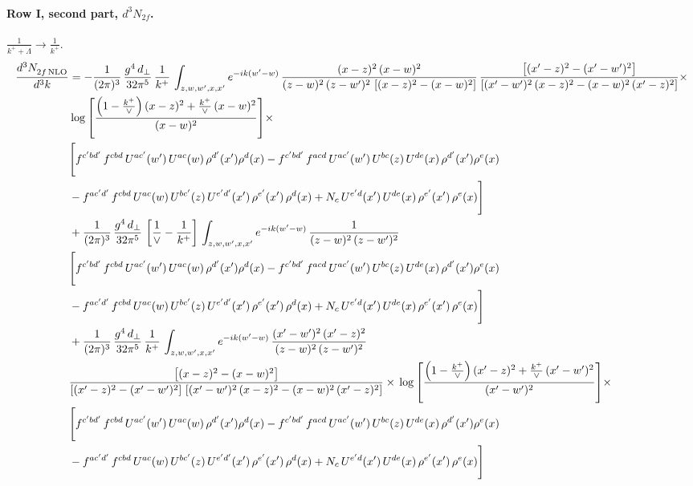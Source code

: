 \documentclass[10pt]{article}
\numberwithin{equation}{section}
\begin{document}
\paragraph{Row I, second part, $d^3N_{2f}$.}
$\frac{1}{k^++\Lambda}\to\frac{1}{k^+}$.
\begin{align}
    \frac{d^{3}N_{2f\,\rm NLO}^{\rm}}{d^{3}k}  & =   - \frac{1}{(2\pi)^{3}}\, \frac{g^{4}\,d_{\perp}}{32\pi^{5}}\,\frac{1}{k^{+}}\,\int_{z,w,w^{\prime},x,x'} e^{-ik(w^{\prime}-w)}\,\frac{(x-z)^{2}\, (x-w)^{2}}{(z-w)^{2}\, (z-w')^{2}\,\left[(x-z)^{2} - (x-w)^{2}\right]}\,\frac{\left[(x'-z)^{2}-(x'-w')^{2}\right]}{\left[(x'-w')^{2}\, (x-z)^{2} - (x-w)^{2}\, (x'-z)^{2}\right]}\times\notag \\ & \log{\left[\frac{\left(1-\frac{k^{+}}{\vee}\right)(x-z)^{2}+\frac{k^{+}}{\vee}\,(x-w)^{2}}{(x-w)^{2}}\right]}\times\notag \\ & \Bigg[f^{c'bd'}\,f^{cbd}\, U^{ac'}(w')\,U^{ac}(w)\,\rho^{d'}(x')\rho^{d}(x)- f^{c'bd'}\,f^{acd}\,U^{ac'}(w')\,U^{bc}(z)\,U^{de}(x)\,\rho^{d'}(x')\rho^{e}(x) \notag \\ & -f^{ac'd'}\,f^{cbd}\,U^{ac}(w)\,U^{bc'}(z)\,U^{e'd'}(x')\,\rho^{e'}(x')\,\rho^{d}(x) +N_{c}\,U^{e'd}(x')\,U^{de}(x)\,\rho^{e'}(x')\,\rho^{e}(x)\Bigg]  \notag \\
& + \frac{1}{(2\pi)^{3}}\, \frac{g^{4}\,d_{\perp}}{32\pi^{5}}\,\left[\frac{1}{\vee} - \frac{1}{k^{+}}\right]\,\int_{z,w,w^{\prime},x,x'} e^{-ik(w^{\prime}-w)}\,\frac{1}{(z-w)^{2}\, (z-w')^{2}}\notag \\ & \Bigg[f^{c'bd'}\,f^{cbd}\, U^{ac'}(w')\,U^{ac}(w)\,\rho^{d'}(x')\rho^{d}(x)- f^{c'bd'}\,f^{acd}\,U^{ac'}(w')\,U^{bc}(z)\,U^{de}(x)\,\rho^{d'}(x')\rho^{e}(x) \notag \\ & -f^{ac'd'}\,f^{cbd}\,U^{ac}(w)\,U^{bc'}(z)\,U^{e'd'}(x')\,\rho^{e'}(x')\,\rho^{d}(x) +N_{c}\,U^{e'd}(x')\,U^{de}(x)\,\rho^{e'}(x')\,\rho^{e}(x)\Bigg]  \notag \\
& + \frac{1}{(2\pi)^{3}}\, \frac{g^{4}\,d_{\perp}}{32\pi^{5}}\,\frac{1}{k^{+}}\,\int_{z,w,w^{\prime},x,x'} e^{-ik(w^{\prime}-w)}\,\frac{(x'-w')^{2}\, (x'-z)^{2}}{(z-w)^{2}\, (z-w')^{2}}\notag \\ & \frac{\left[(x-z)^{2} - (x-w)^{2}\right]}{\left[(x'-z)^{2} - (x'-w')^{2}\right]\, \left[(x'-w')^{2}\, (x - z)^{2} - (x-w)^{2}\,(x'-z)^{2}\right]}\times\, \log{\left[\frac{\left(1-\frac{k^{+}}{\vee}\right)(x'-z)^{2}+\frac{k^{+}}{\vee}\,(x'-w')^{2}}{(x'-w')^{2}}\right]}\times \notag \\ &  \Bigg[f^{c'bd'}\,f^{cbd}\, U^{ac'}(w')\,U^{ac}(w)\,\rho^{d'}(x')\rho^{d}(x)- f^{c'bd'}\,f^{acd}\,U^{ac'}(w')\,U^{bc}(z)\,U^{de}(x)\,\rho^{d'}(x')\rho^{e}(x) \notag \\ & -f^{ac'd'}\,f^{cbd}\,U^{ac}(w)\,U^{bc'}(z)\,U^{e'd'}(x')\,\rho^{e'}(x')\,\rho^{d}(x) +N_{c}\,U^{e'd}(x')\,U^{de}(x)\,\rho^{e'}(x')\,\rho^{e}(x)\Bigg] \label{eq:F:G2I2f}
\end{align}
\end{document}
